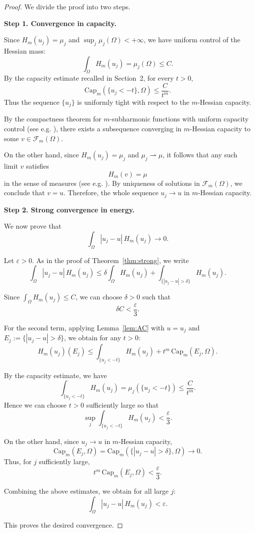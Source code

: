 \documentclass[11pt,reqno]{amsart}
\theoremstyle{definition}
\theoremstyle{remark}
\begin{document}
\begin{proof}
	We divide the proof into two steps.
	
	\medskip
	\noindent
	\textbf{Step 1. Convergence in capacity.}
	
	Since $H_m(u_j)=\mu_j$ and $\sup_j \mu_j(\Omega)<+\infty$, we have
	uniform control of the Hessian mass:
	\[
	\int_\Omega H_m(u_j) = \mu_j(\Omega) \le C.
	\]
	By the capacity estimate recalled in Section~2, for every $t>0$,
	\[
	\mathrm{Cap}_m(\{u_j<-t\},\Omega)
	\le \frac{C}{t^m}.
	\]
	Thus the sequence $\{u_j\}$ is uniformly tight with respect to the
	$m$-Hessian capacity.
	
	By the compactness theorem for $m$-subharmonic functions with uniform
	capacity control (see e.g. \cite{DinewKolodziej2014}), there exists a subsequence
	converging in $m$-Hessian capacity to some $v \in \mathcal{F}_m(\Omega)$.
	
	On the other hand, since $H_m(u_j)=\mu_j$ and $\mu_j \rightharpoonup \mu$,
	it follows that any such limit $v$ satisfies
	\[
	H_m(v) = \mu
	\]
	in the sense of measures (see e.g. \cite{DinewKolodziej2014, Lu}).
	By uniqueness of solutions in $\mathcal{F}_m(\Omega)$, we conclude that $v=u$.
	Therefore, the whole sequence $u_j \to u$ in $m$-Hessian capacity.
	
	\medskip
	\noindent
	\textbf{Step 2. Strong convergence in energy.}
	
	We now prove that
	\[
	\int_\Omega |u_j-u|\,H_m(u_j) \longrightarrow 0.
	\]
	
	Let $\varepsilon>0$. As in the proof of Theorem~\ref{thm:strong}, we write
	\[
	\int_\Omega |u_j-u|\,H_m(u_j)
	\le
	\delta \int_\Omega H_m(u_j)
	+
	\int_{\{|u_j-u|>\delta\}} H_m(u_j).
	\]
	
	Since $\int_\Omega H_m(u_j)\le C$, we can choose $\delta>0$ such that
	\[
	\delta C < \frac{\varepsilon}{3}.
	\]
	
	For the second term, applying Lemma~\ref{lem:AC} with $u=u_j$ and
	$E_j := \{|u_j-u|>\delta\}$, we obtain for any $t>0$:
	\[
	H_m(u_j)(E_j)
	\le
	\int_{\{u_j<-t\}} H_m(u_j)
	+
	t^m\,\mathrm{Cap}_m(E_j,\Omega).
	\]
	
	By the capacity estimate, we have
	\[
	\int_{\{u_j<-t\}} H_m(u_j)
	=
	\mu_j(\{u_j<-t\})
	\le \frac{C}{t^m}.
	\]
	Hence we can choose $t>0$ sufficiently large so that
	\[
	\sup_j \int_{\{u_j<-t\}} H_m(u_j)
	<
	\frac{\varepsilon}{3}.
	\]
	
	On the other hand, since $u_j \to u$ in $m$-Hessian capacity,
	\[
	\mathrm{Cap}_m(E_j,\Omega)
	=
	\mathrm{Cap}_m(\{|u_j-u|>\delta\},\Omega)
	\longrightarrow 0.
	\]
	Thus, for $j$ sufficiently large,
	\[
	t^m\,\mathrm{Cap}_m(E_j,\Omega)
	<
	\frac{\varepsilon}{3}.
	\]
	
	Combining the above estimates, we obtain for all large $j$:
	\[
	\int_\Omega |u_j-u|\,H_m(u_j)
	<
	\varepsilon.
	\]
	
	This proves the desired convergence.
\end{proof}
\end{document}
